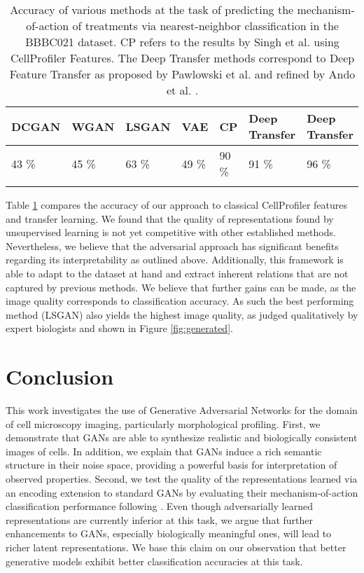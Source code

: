\documentclass{article}
\begin{document}
\begin{table}
  \centering
  \begin{tabular}{lllllll}
  	\toprule
    DCGAN & WGAN & LSGAN & VAE \cite{pawlowski2016msc} & CP \cite{Singh2014} & Deep Transfer \cite{pawlowski2016automating}  & Deep Transfer \cite{ando2017improving} \\
    \midrule
    43 \%& 45 \% & 63 \% & 49 \% & 90 \% & 91 \% & 96 \% \\
    \bottomrule \\
  \end{tabular}
  \caption{Accuracy of various methods at the task of predicting the mechanism-of-action of treatments via nearest-neighbor classification in the BBBC021 dataset. CP refers to the results by Singh et al. \cite{Singh2014} using CellProfiler Features. The Deep Transfer methods correspond to Deep Feature Transfer as proposed by Pawlowski et al. \cite{pawlowski2016automating} and refined by Ando et al. \cite{ando2017improving}.}
  \label{moa-results}
  \vspace{-0.1cm}
\end{table}

Table \ref{moa-results} compares the accuracy of our approach to classical CellProfiler features and transfer learning. We found that the quality of representations found by unsupervised learning is not yet competitive with other established methods. Nevertheless, we believe that the adversarial approach has significant benefits regarding its interpretability as outlined above. Additionally, this framework is able to adapt to the dataset at hand and extract inherent relations that are not captured by previous methods. We believe that further gains can be made, as the image quality corresponds to classification accuracy. As such the best performing method (LSGAN) also yields the highest image quality, as judged qualitatively by expert biologists and shown in Figure \ref{fig:generated}.


\section{Conclusion}
This work investigates the use of Generative Adversarial Networks for the domain
of cell microscopy imaging, particularly morphological profiling. First, we
demonstrate that GANs are able to synthesize realistic and biologically
consistent images of cells. In addition, we explain that GANs induce a rich
semantic structure in their noise space, providing a powerful basis for
interpretation of observed properties. Second, we test the quality of the
representations learned via an encoding extension to standard GANs by evaluating
their mechanism-of-action classification performance following \cite{Ljosa2013}.
Even though adversarially learned representations are currently inferior at this
task, we argue that further enhancements to GANs, especially biologically
meaningful ones, will lead to richer latent representations. We base this claim
on our observation that better generative models exhibit better classification
accuracies at this task.
\end{document}
